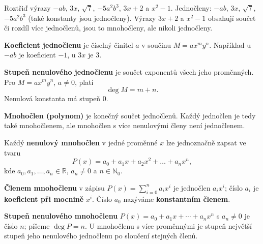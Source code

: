 \documentclass[11pt,a4paper]{article}
\begin{document}
\begin{prikladReseniBox}[title={Příklad 2},breakable=false]
Roztřiď výrazy $-ab$, $3x$, $\sqrt7$, $-5a^2b^3$, $3x+2$ a $x^2-1$.
\tcblower
Jednočleny: $-ab$, $3x$, $\sqrt7$, $-5a^2b^3$ (také konstanty jsou jednočleny). Výrazy $3x+2$ a $x^2-1$ obsahují součet či rozdíl více jednočlenů, jsou to mnohočleny, ale nikoli jednočleny.
\end{prikladReseniBox}

\begin{definiceBox}[title={Definice - Koeficient jednočlenu}]
\textbf{Koeficient jednočlenu} je číselný činitel $a$ v součinu $M=ax^m y^n$. Například u $-ab$ je koeficient $-1$, u $3x$ je $3$.
\end{definiceBox}

\begin{definiceBox}[title={Definice - Stupeň jednočlenu}]
\textbf{Stupeň nenulového jednočlenu} je součet exponentů všech jeho proměnných. Pro $M=ax^m y^n$, $a\ne0$, platí
\[
\deg M=m+n.
\]
Nenulová konstanta má stupeň $0$.
\end{definiceBox}


\begin{definiceBox}[title={Definice - Mnohočlen}]
\textbf{Mnohočlen (polynom)} je konečný součet jednočlenů. Každý jednočlen je tedy také mnohočlenem, ale mnohočlen s více nenulovými členy není jednočlenem.
\end{definiceBox}

\begin{definiceBox}[title={Věta - Jednoznačný zápis mnohočlenu}]
Každý \textbf{nenulový mnohočlen} v jedné proměnné $x$ lze jednoznačně zapsat ve tvaru
\[
P(x)=a_0+a_1x+a_2x^2+\dots+a_nx^n,
\]
kde $a_0,a_1,\ldots,a_n\in\mathbb R$, $a_n\ne0$ a $n\in\mathbb N_0$.
\end{definiceBox}

\begin{definiceBox}[title={Definice - Člen a koeficient mnohočlenu}]
\textbf{Členem mnohočlenu} v zápisu $P(x)=\sum_{i=0}^{n}a_ix^i$ je jednočlen $a_ix^i$; číslo $a_i$ je \textbf{koeficient při mocnině} $x^i$. Číslo $a_0$ nazýváme \textbf{konstantním členem}.
\end{definiceBox}

\begin{definiceBox}[title={Definice - Stupeň mnohočlenu}]
\textbf{Stupeň nenulového mnohočlenu} $P(x)=a_0+a_1x+\cdots+a_nx^n$ s $a_n\ne0$ je číslo $n$; píšeme $\deg P=n$. U mnohočlenu s více proměnnými je stupeň největší stupeň jeho nenulového jednočlenu po sloučení stejných členů.
\end{definiceBox}
\end{document}
